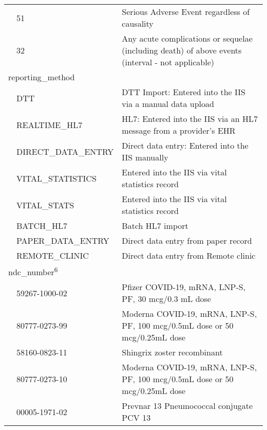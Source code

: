 \documentclass[
  letterpaper,
  DIV=11,
  numbers=noendperiod]{scrreprt}
\begin{document}
\begin{longtable}{l|ll}
  & 51 & Serious Adverse Event regardless of causality \\ 
  & 32 & Any acute complications or sequelae (including death) of above events 
                         (interval - not applicable) \\ 
\midrule
\multicolumn{3}{l}{reporting\_method} \\ 
\midrule
  & DTT & DTT Import: Entered into the IIS via a manual data upload \\ 
  & REALTIME\_HL7 & HL7: Entered into the IIS via an HL7 message from a provider’s EHR \\ 
  & DIRECT\_DATA\_ENTRY & Direct data entry: Entered into the IIS manually \\ 
  & VITAL\_STATISTICS & Entered into the IIS via vital statistics record \\ 
  & VITAL\_STATS & Entered into the IIS via vital statistics record \\ 
  & BATCH\_HL7 & Batch HL7 import \\ 
  & PAPER\_DATA\_ENTRY & Direct data entry from paper record \\ 
  & REMOTE\_CLINIC & Direct data entry from Remote clinic \\ 
\midrule
\multicolumn{3}{l}{ndc\_number\textsuperscript{6}} \\ 
\midrule
  & 59267-1000-02 & Pfizer COVID-19, mRNA, LNP-S, PF, 30 mcg/0.3 mL dose \\ 
  & 80777-0273-99 & Moderna COVID-19, mRNA, LNP-S, PF, 100 mcg/0.5mL dose or 50 mcg/0.25mL dose \\ 
  & 58160-0823-11 & Shingrix zoster recombinant \\ 
  & 80777-0273-10 & Moderna COVID-19, mRNA, LNP-S, PF, 100 mcg/0.5mL dose or 50 mcg/0.25mL dose \\ 
  & 00005-1971-02 & Prevnar 13 Pneumococcal conjugate PCV 13 \\ 
\bottomrule
\end{longtable}
\end{document}
